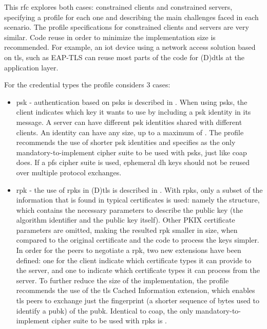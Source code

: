 \documentclass{llncs}
\begin{document}
{This \gls{rfc} explores both cases: constrained clients and constrained servers, specifying
a profile for each one and describing the main challenges faced in each scenario.
The profile specifications for constrained clients and servers are very similar.
Code reuse in order to minimize the implementation size is recommended. For example, an \gls{iot} device
using a network access solution based on \gls{tls}, such as EAP-TLS\cite{rfc5216}
can reuse most parts of the code for (D)\gls{dtls} at the application layer.

For the credential types the profile considers 3 cases:

\begin{itemize}
  \item \gls{psk} - authentication based on \gls{psk}s is described in
  \cite{RFC4279}. When using \gls{psk}s, the client indicates which
  key it wants to use by including a \gls{psk} identity in its  message.
  A server can have different \gls{psk} identities shared with different clients.
  An identity can have any size, up to a maximum of .
  The profile recommends the use of shorter \gls{psk} identities and specifies
   as the only mandatory-to-implement
  cipher suite to be used with \gls{psk}s, just like \gls{coap} does. If a \gls{pfs} cipher suite is used, ephemeral
  \gls{dh} keys should not be reused over multiple protocol exchanges.

  \item \gls{rpk} - the use of \gls{rpk}s in (D)\gls{tls} is described in \cite{RFC7250}.
  With \gls{rpk}s, only a subset of the information that is found in typical certificates
  is used: namely the  structure, which contains
  the necessary parameters to describe the public key (the algorithm identifier
  and the public key itself). Other PKIX certificate\cite{RFCabc} parameters are
  omitted, making the resulted \gls{rpk} smaller in size, when compared to the
  original certificate and the code to process the keys simpler. In order for the
  peers to negotiate a \gls{rpk}, two new extensions have been defined:
  one for the client indicate which certificate types it can provide to the server, and one to indicate which certificate types it can process from the server. To further reduce the size of the implementation, the profile
  recommends the use of the \gls{tls} Cached Information extension\cite{RFC7924}, which
  enables \gls{tls} peers to exchange just the fingerprint (a shorter sequence of bytes
  used to identify a \gls{pubk}) of the \gls{pubk}. Identical to \gls{coap}, the only mandatory-to-implement
  cipher suite to be used with \gls{rpk}s is .


\end{itemize}}
\end{document}
